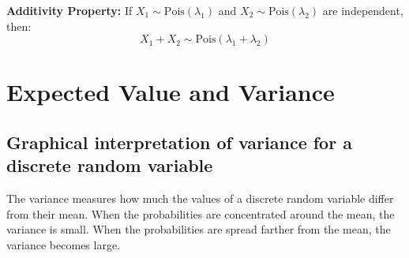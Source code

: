 \documentclass[12pt]{article}
\begin{document}
\textbf{Additivity Property:} If $X_1 \sim \text{Pois}(\lambda_1)$ and $X_2 \sim \text{Pois}(\lambda_2)$ are independent, then:
$$X_1 + X_2 \sim \text{Pois}(\lambda_1 + \lambda_2)$$
\section{Expected Value and Variance}

\subsection{Graphical interpretation of variance for a discrete random variable}

The variance measures how much the values of a discrete random variable differ from their mean.  
When the probabilities are concentrated around the mean, the variance is small.  
When the probabilities are spread farther from the mean, the variance becomes large.
\end{document}
